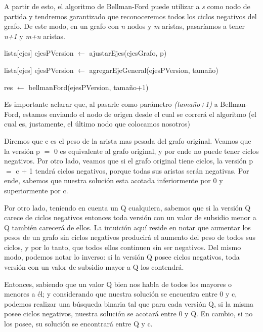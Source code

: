 A partir de esto, el algoritmo de Bellman-Ford puede utilizar a \textit{s} como nodo de partida y tendremos garantizado que reconoceremos todos los ciclos negativos del grafo. De este modo, en un grafo con \textit{n} nodos y \textit{m} aristas, pasaríamos a tener \textit{n+1} y \textit{m+n} aristas.

\begin{algorithm}[H]
	\NoCaptionOfAlgo
	\caption{}
	
	lista[ejes] ejesPVersion $\leftarrow$ ajustarEjes(ejesGrafo, p)
	
	lista[ejes] ejesPVersion $\leftarrow$ agregarEjeGeneral(ejesPVersion, tamaño)

	res $\leftarrow$ bellmanFord(ejesPVersion, tamaño+1)
\end{algorithm}

Es importante aclarar que, al pasarle como parámetro \textit{(tamaño+1)} a Bellman-Ford, estamos enviando el nodo de origen desde el cual se correrá el algoritmo (el cual es, justamente, el último nodo que colocamos nosotros)

Diremos que c es el peso de la arista mas pesada del grafo original. Veamos que la versión p $=$ 0 es equivalente al grafo original, y por ende no puede tener ciclos negativos. Por otro lado, veamos que si el grafo original tiene ciclos, la versión p $=$ c + 1 tendrá ciclos negativos, porque todas sus aristas serán negativas. Por ende, sabemos que nuestra solución esta acotada inferiormente por 0 y superiormente por c.

Por otro lado, teniendo en cuenta un Q cualquiera, sabemos que si la versión Q carece de ciclos negativos entonces toda versión con un valor de subsidio menor a Q también carecerá de ellos. La intuición aquí reside en notar que aumentar los pesos de un grafo sin ciclos negativos producirá el aumento del peso de todos sus ciclos, y por lo tanto, que todos ellos continuen sin ser negativos. Del mismo modo, podemos notar lo inverso: si la versión Q posee ciclos negativos, toda versión con un valor de subsidio mayor a Q los contendrá.

Entonces, sabiendo que un valor Q bien nos habla de todos los mayores o menores a él; y considerando que nuestra solución se encuentra entre 0 y c, podemos realizar una búsqueda binaria tal que para cada versión Q, si la misma posee ciclos negativos, nuestra solución se acotará entre 0 y Q. En cambio, si no los posee, su solución se encontrará entre Q y c.

